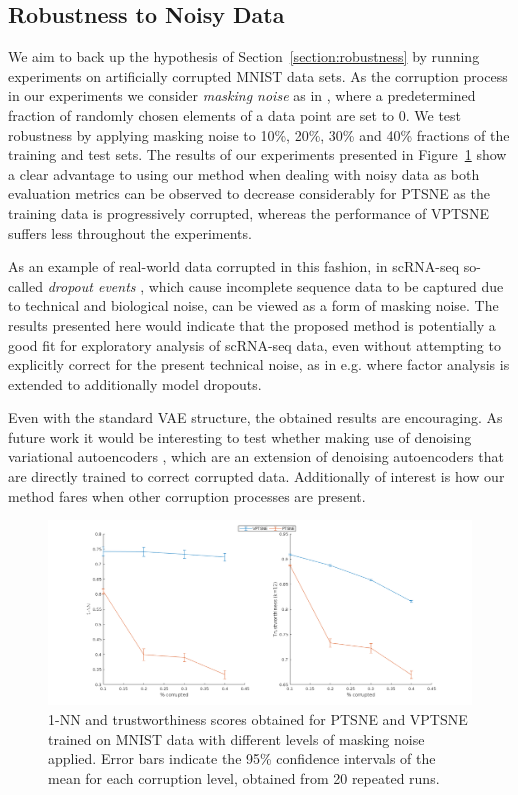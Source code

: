 \subsection{Robustness to Noisy Data}

We aim to back up the hypothesis of Section~\ref{section:robustness} by running experiments on artificially corrupted MNIST data sets. As the corruption process in our experiments we consider \textit{masking noise} as in \cite{stacked_denoising_ae}, where a predetermined fraction of randomly chosen elements of a data point are set to 0. We test robustness by applying masking noise to 10\%, 20\%, 30\% and 40\% fractions of the training and test sets. The results of our experiments presented in Figure~\ref{fig:corrupted_data} show a clear advantage to using our method when dealing with noisy data as both evaluation metrics can be observed to decrease considerably for PTSNE as the training data is progressively corrupted, whereas the performance of VPTSNE suffers less throughout the experiments.

As an example of real-world data corrupted in this fashion, in scRNA-seq so-called \textit{dropout events} \cite{sc_dropout}, which cause incomplete sequence data to be captured due to technical and biological noise, can be viewed as a form of masking noise. The results presented here would indicate that the proposed method is potentially a good fit for exploratory analysis of scRNA-seq data, even without attempting to explicitly correct for the present technical noise, as in e.g. \cite{zifa} where factor analysis is extended to additionally model dropouts.

Even with the standard VAE structure, the obtained results are encouraging. As future work it would be interesting to test whether making use of denoising variational autoencoders \cite{denoising_vae}, which are an extension of denoising autoencoders \cite{stacked_denoising_ae} that are directly trained to correct corrupted data. Additionally of interest is how our method fares when other corruption processes are present.

\begin{figure}[!htb]
  \centering
  \includegraphics[width=\textwidth]{images/corrupted.png}
  \caption{1-NN and trustworthiness scores obtained for PTSNE and VPTSNE trained on MNIST data with different levels of masking noise applied. Error bars indicate the 95\% confidence intervals of the mean for each corruption level, obtained from 20 repeated runs.}
  \label{fig:corrupted_data}
\end{figure}

